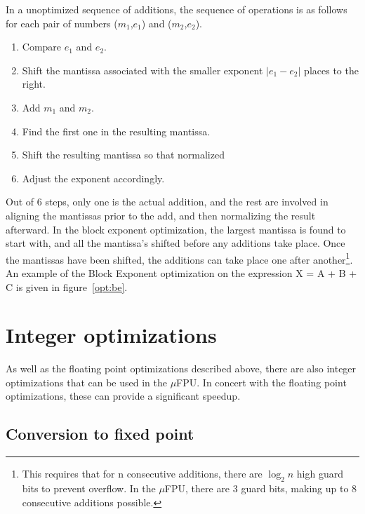 In a unoptimized sequence of additions, the sequence of operations is as
follows for each pair of numbers ($m_1$,$e_1$) and ($m_2$,$e_2$).
\begin{enumerate}
  \item Compare $e_1$ and $e_2$.
  \item Shift the mantissa associated with the smaller exponent $|e_1-e_2|$
        places to the right.
  \item Add $m_1$ and $m_2$.
  \item Find the first one in the resulting mantissa.
  \item Shift the resulting mantissa so that normalized
  \item Adjust the exponent accordingly.
\end{enumerate}

Out of 6 steps, only one is the actual addition, and the rest are involved
in aligning the mantissas prior to the add, and then normalizing the result
afterward.  In the block exponent optimization, the largest mantissa is
found to start with, and all the mantissa's shifted before any additions
take place.  Once the mantissas have been shifted, the additions can take
place one after another\footnote{This requires that for n consecutive
additions, there are $\log_{2}n$ high guard bits to prevent overflow.  In
the $\mu$FPU, there are 3 guard bits, making up to 8 consecutive additions
possible.}.  An example of the Block Exponent optimization on the expression
X = A + B + C is given in figure~\ref{opt:be}.

%

\section{Integer optimizations}

As well as the floating point optimizations described above, there are
also integer optimizations that can be used in the $\mu$FPU.  In concert
with the floating point optimizations, these can provide a significant
speedup.  

\subsection{Conversion to fixed point}

